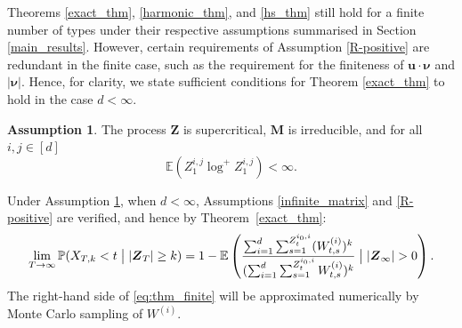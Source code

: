 \documentclass[preprint,3p,12pt]{elsarticle}
\theoremstyle{definition}
\newtheorem{assumption}{Assumption}
\newcommand{\z}[1][i_0, i]{Z_t^{#1}}
\begin{document}
Theorems \ref{exact_thm}, \ref{harmonic_thm}, and \ref{hs_thm} still hold for a finite number of types under their respective assumptions summarised in Section \ref{main_results}.
However, certain requirements of Assumption \ref{R-positive} are redundant in the finite case, such as the requirement for the finiteness of $\boldsymbol{u} \cdot \boldsymbol{\nu}$ and $|\boldsymbol{\nu}|$. Hence, for clarity, we state sufficient conditions for Theorem \ref{exact_thm} to hold in the case $d<\infty$. 
\begin{assumption} \label{finite_types}
The process $\boldsymbol{Z}$ is supercritical, $\boldsymbol{M}$ is irreducible, and for all $i,j  \in [d]$
\begin{equation*}
    \mathbb{E}(Z_1^{i,j} \log^+ Z_1^{i,j})< \infty.
\end{equation*}
\end{assumption}
Under Assumption \ref{finite_types}, when $d <\infty$, Assumptions \ref{infinite_matrix} and \ref{R-positive} are verified, and hence by Theorem~\ref{exact_thm}:
\begin{equation}
 \lim_{T \rightarrow \infty}\mathbb{P}(X_{T,k} < t\bigm| |\boldsymbol{Z}_T| \ge k ) = 
     1 - \mathbb{E}\left(\frac{\sum_{i=1}^d\sum_{s=1}^{\z} (W_{t,s}^{(i)})^k }
    {(\sum_{i=1}^d\sum_{s=1}^{\z}W_{t,s}^{(i)})^k}\bigm| |\boldsymbol{Z}_{\infty}| > 0  \right) \label{eq:thm_finite}.
\end{equation}
The right-hand side of \eqref{eq:thm_finite} will be approximated numerically by Monte Carlo sampling of $W^{(i)}$.
\end{document}
